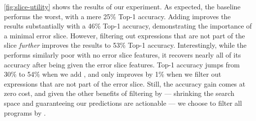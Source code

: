 \autoref{fig:slice-utility} shows the results of our experiment.
%
As expected, the baseline performs the worst, with a mere 25\% \linear
Top-1 accuracy.
%
Adding \InSlice improves the results substantially with a 46\% \linear Top-1
accuracy, demonstrating the importance of a minimal error slice.
%
However, filtering out expressions that are not part of the slice
\emph{further} improves the results to 53\% \linear Top-1 accuracy.
%
Interestingly, while the \hiddenFH performs similarly poor with no error
slice features, it recovers nearly all of its accuracy after being given
the error slice features.
%
Top-1 accuracy jumps from 30\% to 54\% when we add \InSlice, and only
improves by 1\% when we filter out expressions that are not part of the
error slice.
%
Still, the accuracy gain comes at zero cost, and given the other benefits
of filtering by \InSlice %
--- shrinking the search space and guaranteeing our predictions are actionable ---
we choose to filter all programs by \InSlice.

\label{sec:contextual-features}

